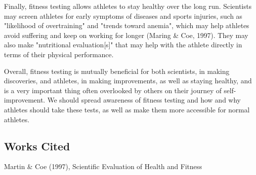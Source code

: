 \documentclass[12pt]{article}
\begin{document}
Finally, fitness testing allows athletes to stay healthy over the long run. Scientists may screen athletes for early symptoms of diseases and sports injuries, such as "likelihood of overtraining" and "trends toward anemia", which may help athletes avoid suffering and keep on working for longer (Maring \& Coe, 1997). They may also make "nutritional evaluation[s]" that may help with the athlete directly in terms of their physical performance.

Overall, fitness testing is mutually beneficial for both scientists, in making discoveries, and athletes, in making improvements, as well as staying healthy, and is a very important thing often overlooked by others on their journey of self-improvement. We should spread awareness of fitness testing and how and why athletes should take these tests, as well as make them more accessible for normal athletes.

\subsection*{Works Cited}
Martin \& Coe (1997), Scientific Evaluation of Health and Fitness
\end{document}
